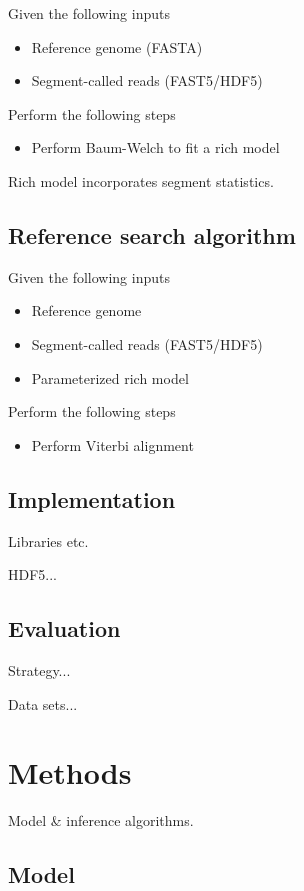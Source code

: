 \documentclass[10pt]{article}
\begin{document}
Given the following inputs
\begin{itemize}
\item Reference genome (FASTA)
\item Segment-called reads (FAST5/HDF5)
\end{itemize}

Perform the following steps
\begin{itemize}
\item Perform Baum-Welch to fit a rich model
\end{itemize}

Rich model incorporates segment statistics.

\subsection{Reference search algorithm}

Given the following inputs
\begin{itemize}
\item Reference genome
\item Segment-called reads (FAST5/HDF5)
\item Parameterized rich model
\end{itemize}

Perform the following steps
\begin{itemize}
\item Perform Viterbi alignment
\end{itemize}

\subsection{Implementation}

Libraries etc.

HDF5...

\subsection{Evaluation}

Strategy...

Data sets...

\section{Methods}

Model \& inference algorithms.

\subsection{Model}
\end{document}
